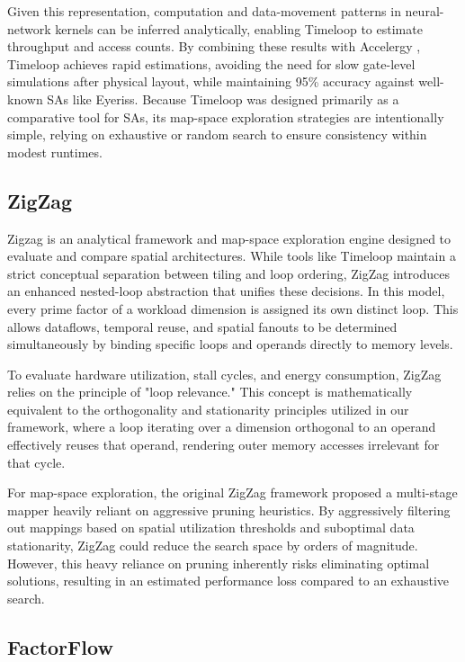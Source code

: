 Given this representation, computation and data-movement patterns in neural-network kernels can be inferred analytically, enabling Timeloop to estimate throughput and access counts. By combining these results with Accelergy \cite{wu2019accelergy}, Timeloop achieves rapid estimations, avoiding the need for slow gate-level simulations after physical layout, while maintaining 95\% accuracy against well-known SAs like Eyeriss. Because Timeloop was designed primarily as a comparative tool for SAs, its map-space exploration strategies are intentionally simple, relying on exhaustive or random search to ensure consistency within modest runtimes.



\subsection{ZigZag}
Zigzag \cite{zigzag} is an analytical framework and map-space exploration engine designed to evaluate and compare spatial architectures. While tools like Timeloop maintain a strict conceptual separation between tiling and loop ordering, ZigZag introduces an enhanced nested-loop abstraction that unifies these decisions. In this model, every prime factor of a workload dimension is assigned its own distinct loop. This allows dataflows, temporal reuse, and spatial fanouts to be determined simultaneously by binding specific loops and operands directly to memory levels. 

To evaluate hardware utilization, stall cycles, and energy consumption, ZigZag relies on the principle of "loop relevance." This concept is mathematically equivalent to the orthogonality and stationarity principles utilized in our framework, where a loop iterating over a dimension orthogonal to an operand effectively reuses that operand, rendering outer memory accesses irrelevant for that cycle. 

For map-space exploration, the original ZigZag framework proposed a multi-stage mapper heavily reliant on aggressive pruning heuristics. By aggressively filtering out mappings based on spatial utilization thresholds and suboptimal data stationarity, ZigZag could reduce the search space by orders of magnitude. However, this heavy reliance on pruning inherently risks eliminating optimal solutions, resulting in an estimated performance loss compared to an exhaustive search. 

\subsection{FactorFlow}
\label{sec:rw-factorflow}


